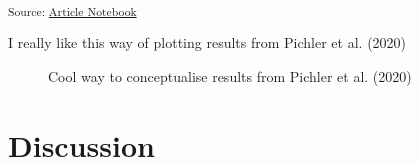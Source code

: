 \documentclass[
  letterpaper,
  DIV=11,
  numbers=noendperiod]{scrartcl}
\begin{document}
\textsubscript{Source:
\href{https://BecksLab.github.io/ms_t_is_for_topology/index.qmd.html}{Article
Notebook}}

I really like this way of plotting results from Pichler et al. (2020)

\begin{figure}


\caption{\label{fig-pichler}Cool way to conceptualise results from
Pichler et al. (2020)}

\end{figure}%

\section{Discussion}\label{discussion}
\end{document}
